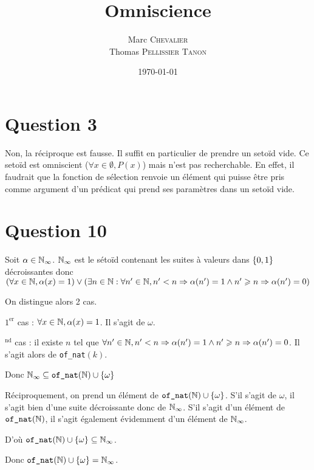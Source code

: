 

\author{
    Marc \textsc{Chevalier}\\
    Thomas \textsc{Pellissier Tanon}
}
\date{\today}
\title{Omniscience}


\maketitle

\section*{Question 3}

Non, la réciproque est fausse. Il suffit en particulier de prendre un setoïd vide. Ce setoïd est omniscient ($\forall x\in \emptyset, P(x)$) mais n'est pas recherchable. En effet, il faudrait que la fonction de sélection renvoie un élément qui puisse être pris comme argument d'un prédicat qui prend ses paramètres dans un setoïd vide.

\section*{Question 10}

Soit $\alpha\in\mathbb{N}_\infty$. $\mathbb{N}_\infty$ est le sétoïd contenant les suites à valeurs dans $\left\{ 0,1 \right\}$ décroissantes donc $(\forall x\in \mathbb{N}, \alpha(x) = 1) \vee (\exists n\in\mathbb{N} : \forall n'\in\mathbb{N}, n'<n \Rightarrow \alpha(n')=1 \wedge n'\geqslant n \Rightarrow \alpha(n')=0)$

On distingue alors 2 cas.

$1^\text{er}$ cas : $\forall x\in \mathbb{N}, \alpha(x) = 1$.
Il s'agit de $\omega$.

$^\text{nd}$ cas : il existe $n$ tel que $\forall n'\in\mathbb{N}, n'<n \Rightarrow \alpha(n')=1 \wedge n'\geqslant n \Rightarrow \alpha(n')=0$.
Il s'agit alors de \texttt{of\_nat}$(k)$.

Donc $\mathbb{N}_\infty \subseteq \texttt{of\_nat}(\mathbb{N})\cup\left\{ \omega \right\}$

Réciproquement, on prend un élément de $\texttt{of\_nat}(\mathbb{N})\cup\left\{ \omega \right\}$. S'il s'agit de $\omega$, il s'agit bien d'une suite décroissante donc de $\mathbb{N}_\infty$. S'il s'agit d'un élément de $\texttt{of\_nat}(\mathbb{N})$, il s'agit également évidemment d'un élément de $\mathbb{N}_\infty$.

D'où $\texttt{of\_nat}(\mathbb{N})\cup\left\{ \omega \right\} \subseteq \mathbb{N}_\infty$.

Donc $\texttt{of\_nat}(\mathbb{N})\cup\left\{ \omega \right\} = \mathbb{N}_\infty$.



